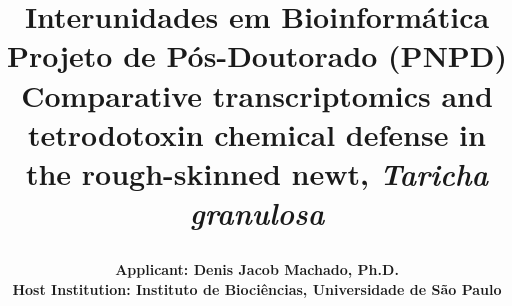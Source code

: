 \begin{titlepage}
    \author{
        \parbox{\linewidth}{\flushleft \fontsize{11}{14} \sffamily \bfseries 
            Applicant: Denis Jacob Machado, Ph.D.\\
            Host Institution: Instituto de Biociências, Universidade de São Paulo%
        } %
    } %
    \title{
        {\fontsize{14}{17} \sc \sffamily
            Interunidades em Bioinformática %
        }\\[-2mm]
        {\fontsize{14}{17} \sffamily
            Projeto de Pós-Doutorado (PNPD) %
        }\\[10mm]
        {\color{RoyalBlue} \sffamily
            Comparative transcriptomics and tetrodotoxin chemical defense in the rough-skinned newt, \textit{Taricha granulosa} %
        }
        \date{} %
    } %
    \maketitle \thispagestyle{empty} %
    \renewcommand{\abstractname}{\color{RoyalBlue} \fontsize{12}{15} \bfseries \sffamily {Abstract}} %
    \begin{abstract}
    


\end{abstract}
\end{titlepage}
